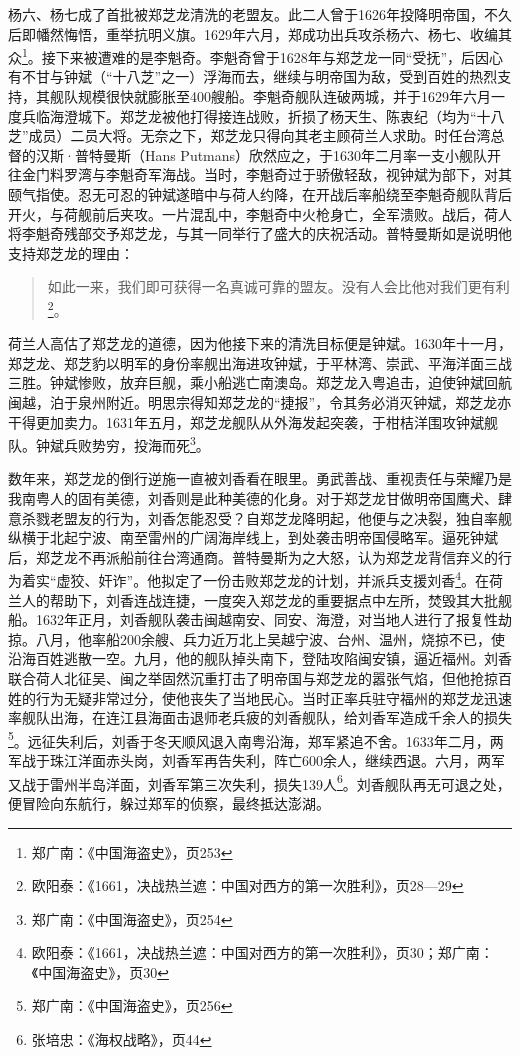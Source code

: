 杨六、杨七成了首批被郑芝龙清洗的老盟友。此二人曾于1626年投降明帝国，不久后即幡然悔悟，重举抗明义旗。1629年六月，郑成功出兵攻杀杨六、杨七、收编其众\footnote{郑广南：《中国海盗史》，页253}。接下来被遭难的是李魁奇。李魁奇曾于1628年与郑芝龙一同“受抚”，后因心有不甘与钟斌（“十八芝”之一）浮海而去，继续与明帝国为敌，受到百姓的热烈支持，其舰队规模很快就膨胀至400艘船。李魁奇舰队连破两城，并于1629年六月一度兵临海澄城下。郑芝龙被他打得接连战败，折损了杨天生、陈衷纪（均为“十八芝”成员）二员大将。无奈之下，郑芝龙只得向其老主顾荷兰人求助。时任台湾总督的汉斯·普特曼斯（Hans Putmans）欣然应之，于1630年二月率一支小舰队开往金门料罗湾与李魁奇军海战。当时，李魁奇过于骄傲轻敌，视钟斌为部下，对其颐气指使。忍无可忍的钟斌遂暗中与荷人约降，在开战后率船绕至李魁奇舰队背后开火，与荷舰前后夹攻。一片混乱中，李魁奇中火枪身亡，全军溃败。战后，荷人将李魁奇残部交予郑芝龙，与其一同举行了盛大的庆祝活动。普特曼斯如是说明他支持郑芝龙的理由：

\begin{quote}

如此一来，我们即可获得一名真诚可靠的盟友。没有人会比他对我们更有利\footnote{欧阳泰：《1661，决战热兰遮：中国对西方的第一次胜利》，页28—29}。

\end{quote}

荷兰人高估了郑芝龙的道德，因为他接下来的清洗目标便是钟斌。1630年十一月，郑芝龙、郑芝豹以明军的身份率舰出海进攻钟斌，于平林湾、崇武、平海洋面三战三胜。钟斌惨败，放弃巨舰，乘小船逃亡南澳岛。郑芝龙入粤追击，迫使钟斌回航闽越，泊于泉州附近。明思宗得知郑芝龙的“捷报”，令其务必消灭钟斌，郑芝龙亦干得更加卖力。1631年五月，郑芝龙舰队从外海发起突袭，于柑桔洋围攻钟斌舰队。钟斌兵败势穷，投海而死\footnote{郑广南：《中国海盗史》，页254}。

数年来，郑芝龙的倒行逆施一直被刘香看在眼里。勇武善战、重视责任与荣耀乃是我南粤人的固有美德，刘香则是此种美德的化身。对于郑芝龙甘做明帝国鹰犬、肆意杀戮老盟友的行为，刘香怎能忍受？自郑芝龙降明起，他便与之决裂，独自率舰纵横于北起宁波、南至雷州的广阔海岸线上，到处袭击明帝国侵略军。逼死钟斌后，郑芝龙不再派船前往台湾通商。普特曼斯为之大怒，认为郑芝龙背信弃义的行为着实“虚狡、奸诈”。他拟定了一份击败郑芝龙的计划，并派兵支援刘香\footnote{欧阳泰：《1661，决战热兰遮：中国对西方的第一次胜利》，页30；郑广南：《中国海盗史》，页30}。在荷兰人的帮助下，刘香连战连捷，一度突入郑芝龙的重要据点中左所，焚毁其大批舰船。1632年正月，刘香舰队袭击闽越南安、同安、海澄，对当地人进行了报复性劫掠。八月，他率船200余艘、兵力近万北上吴越宁波、台州、温州，烧掠不已，使沿海百姓逃散一空。九月，他的舰队掉头南下，登陆攻陷闽安镇，逼近福州。刘香联合荷人北征吴、闽之举固然沉重打击了明帝国与郑芝龙的嚣张气焰，但他抢掠百姓的行为无疑非常过分，使他丧失了当地民心。当时正率兵驻守福州的郑芝龙迅速率舰队出海，在连江县海面击退师老兵疲的刘香舰队，给刘香军造成千余人的损失\footnote{郑广南：《中国海盗史》，页256}。远征失利后，刘香于冬天顺风退入南粤沿海，郑军紧追不舍。1633年二月，两军战于珠江洋面赤头岗，刘香军再告失利，阵亡600余人，继续西退。六月，两军又战于雷州半岛洋面，刘香军第三次失利，损失139人\footnote{张培忠：《海权战略》，页44}。刘香舰队再无可退之处，便冒险向东航行，躲过郑军的侦察，最终抵达澎湖。

